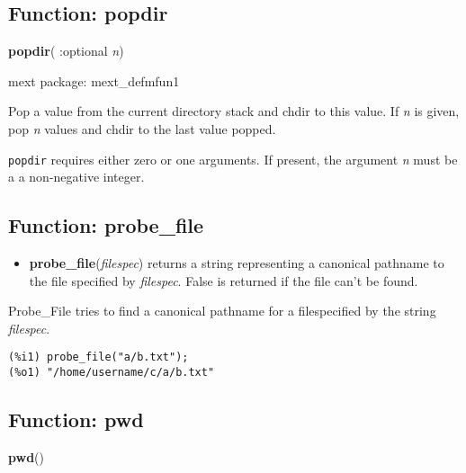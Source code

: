 \documentclass[]{article}
\begin{document}
\vspace{5 pt}


\subsection{Function: popdir\label{sec:popdir}}
\hypertarget{popdir}{}
{\bf popdir}( :optional {\it n})


\noindent mext package: mext\_defmfun1



\vspace{5 pt}
Pop a value from the current directory stack and chdir to this value. If {\it n} is given, pop {\it n} values and chdir to the last value popped. 

\vspace{5 pt}

   {\tt popdir} requires either zero or one arguments. If present, the argument {\it n} must be a a non-negative integer.


\vspace{5 pt}


\subsection{Function: probe\_file\label{sec:probe_file}}
\hypertarget{probe_file}{}



\vspace{5 pt}
\begin{itemize}
\item[] {\bf probe\_file}({\it filespec})
  returns a string representing a canonical pathname to the file specified by {\it filespec}. False is returned if the file can't be found. 

\end{itemize}
Probe\_File tries to find a canonical pathname for a filespecified by the string {\it filespec}. 

\vspace{5 pt}


\begin{Verbatim}[frame=single]
(%i1) probe_file("a/b.txt");
(%o1) "/home/username/c/a/b.txt"
\end{Verbatim}


\subsection{Function: pwd\label{sec:pwd}}
\hypertarget{pwd}{}
{\bf pwd}()
\end{document}

